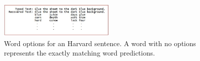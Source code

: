 \documentclass[11pt,conference]{IEEEtran}
\begin{document}
\begin{figure}
\centering
\includegraphics[width=0.5\textwidth]{img/words-options}
\caption{Word options for an Harvard sentence. A word with no options represents the
exactly matching word predictions.}
\label{fig:words-options}
\end{figure}


%
%



%
%
\end{document}
